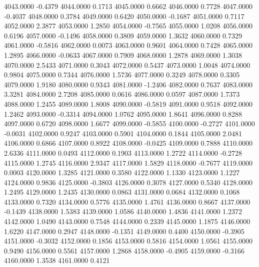 4043.0000     -0.4379
4044.0000      0.1713
4045.0000      0.6662
4046.0000      0.7728
4047.0000     -0.4037
4048.0000      0.3784
4049.0000      0.6420
4050.0000     -0.1687
4051.0000      0.7117
4052.0000      2.3877
4053.0000      1.2850
4054.0000     -0.7565
4055.0000      1.0208
4056.0000      0.6196
4057.0000     -0.1496
4058.0000      0.3809
4059.0000      1.3632
4060.0000      0.7329
4061.0000     -0.5816
4062.0000      0.0073
4063.0000      0.9601
4064.0000      0.7428
4065.0000      1.2895
4066.0000     -0.0633
4067.0000      0.7909
4068.0000      1.2878
4069.0000      1.3038
4070.0000      2.5433
4071.0000      0.3043
4072.0000      0.5437
4073.0000      1.0048
4074.0000      0.9804
4075.0000      0.7344
4076.0000      1.5736
4077.0000      0.3249
4078.0000      0.3305
4079.0000      1.9180
4080.0000      0.9343
4081.0000     -1.2406
4082.0000      0.7637
4083.0000      3.3281
4084.0000      2.7208
4085.0000      0.0616
4086.0000      0.0597
4087.0000      1.7373
4088.0000      1.2455
4089.0000      1.8008
4090.0000     -0.5819
4091.0000      0.9518
4092.0000      1.2462
4093.0000     -0.3314
4094.0000      1.0762
4095.0000      1.8641
4096.0000      0.8288
4097.0000      0.6720
4098.0000      1.6677
4099.0000     -0.5855
4100.0000     -0.2727
4101.0000     -0.0031
4102.0000      0.9247
4103.0000      0.5901
4104.0000      0.1844
4105.0000      2.0481
4106.0000      0.6866
4107.0000      0.8922
4108.0000     -0.0425
4109.0000      0.7888
4110.0000      2.6336
4111.0000      0.0493
4112.0000      0.1903
4113.0000      1.2722
4114.0000     -0.2728
4115.0000      1.2745
4116.0000      2.9347
4117.0000      1.5829
4118.0000     -0.7677
4119.0000      0.0003
4120.0000      1.3285
4121.0000      0.3580
4122.0000      1.1330
4123.0000      1.1227
4124.0000      0.9836
4125.0000     -0.3803
4126.0000      0.3078
4127.0000      0.5340
4128.0000      1.2495
4129.0000      1.2435
4130.0000      0.0863
4131.0000      0.0684
4132.0000      0.1068
4133.0000      0.7320
4134.0000      0.5776
4135.0000      1.4761
4136.0000      0.8667
4137.0000     -0.1439
4138.0000      1.5383
4139.0000      1.0586
4140.0000      1.4836
4141.0000      1.2372
4142.0000      1.0490
4143.0000      0.7548
4144.0000      0.2339
4145.0000      1.1875
4146.0000      1.6220
4147.0000      0.2947
4148.0000     -0.1351
4149.0000      0.4400
4150.0000     -0.3905
4151.0000     -0.3032
4152.0000      0.1856
4153.0000      0.5816
4154.0000      1.0561
4155.0000      0.9490
4156.0000      0.5561
4157.0000      1.2868
4158.0000     -0.4905
4159.0000     -0.3166
4160.0000      1.3538
4161.0000      0.4121
